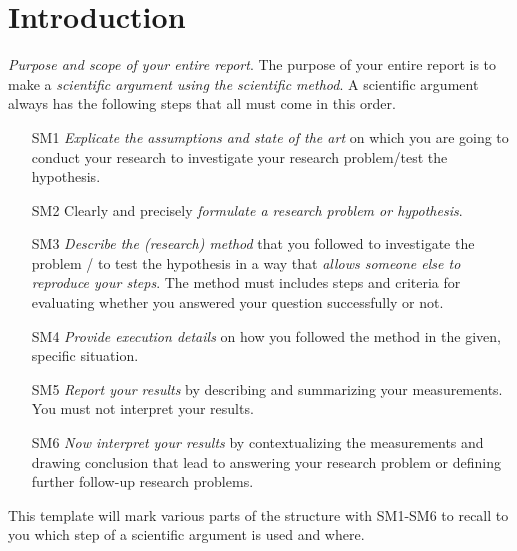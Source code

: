 \documentclass[
  numbers=autoendperiod,
  ngerman,  %
  a4paper,  %
  twoside,  %
  bibliography=totoc,
  headsepline,
  cleardoublepage=empty,
  parskip=half,
  draft=false
]{scrbook}
\theoremstyle{break}
\begin{document}
\printglossary[type=\acronymtype,title={Abkürzungsverzeichnis}]


\renewcommand*{\chapterpagestyle}{scrplain}
\pagestyle{scrheadings}

\chapter{Introduction}\label{sec:introduction}

\emph{Purpose and scope of your entire report}.
The purpose of your entire report is to make a \emph{scientific argument using the scientific method}.
A scientific argument always has the following steps that all must come in this order.
%
\begin{itemize}
  \item[SM1] \emph{Explicate the assumptions and state of the art} on which you are going to conduct your research to investigate your research problem/test the hypothesis.
  \item[SM2] Clearly and precisely \emph{formulate a research problem or hypothesis}.
  \item[SM3] \emph{Describe the (research) method} that you followed to investigate the problem / to test the hypothesis in a way that \emph{allows someone else to reproduce your steps}.
        The method must includes steps and criteria for evaluating whether you answered your question successfully or not.
  \item[SM4] \emph{Provide execution details} on how you followed the method in the given, specific situation.
  \item[SM5] \emph{Report your results} by describing and summarizing your measurements.
        You must not interpret your results.
  \item[SM6] \emph{Now interpret your results} by contextualizing the measurements and drawing conclusion that lead to answering your research problem or defining further follow-up research problems.
\end{itemize}
%
This template will mark various parts of the structure with SM1-SM6 to recall to you which step of a scientific argument is used and where.
\end{document}
